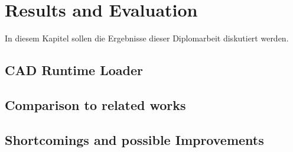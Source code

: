 \chapter{Results and Evaluation}\label{chp:Results}
In diesem Kapitel sollen die Ergebnisse dieser Diplomarbeit diskutiert werden. 
\section{CAD Runtime Loader}

\section{Comparison to related works}

\section{Shortcomings and possible Improvements}